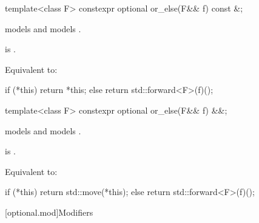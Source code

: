 \begin{itemdecl}
template<class F> constexpr optional or_else(F&& f) const &;
\end{itemdecl}

\begin{itemdescr}
\pnum
\constraints
{} models  and
 models .

\pnum
\mandates
{} is .

\pnum
\effects
Equivalent to:
\begin{codeblock}
if (*this) {
  return *this;
} else {
  return std::forward<F>(f)();
}
\end{codeblock}
\end{itemdescr}

\begin{itemdecl}
template<class F> constexpr optional or_else(F&& f) &&;
\end{itemdecl}

\begin{itemdescr}
\pnum
\constraints
{} models  and
 models .

\pnum
\mandates
{} is .

\pnum
\effects
Equivalent to:
\begin{codeblock}
if (*this) {
  return std::move(*this);
} else {
  return std::forward<F>(f)();
}
\end{codeblock}
\end{itemdescr}

[optional.mod]{Modifiers}

